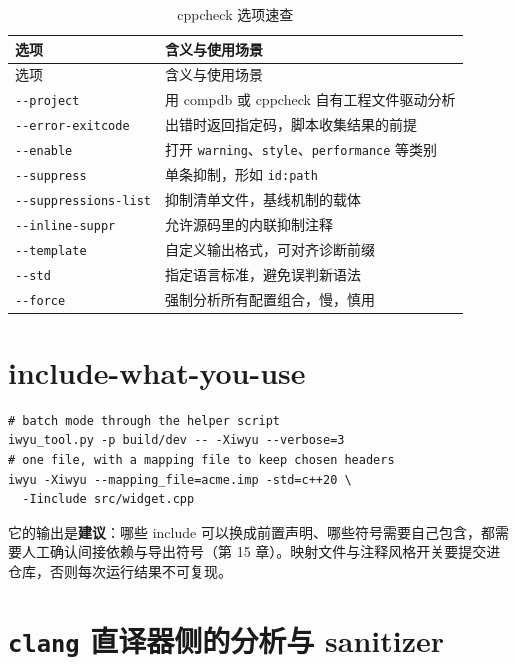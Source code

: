 \documentclass[12pt,a4paper,fontset=fandol]{ctexbook}
\newcommand{\Opt}[1]{\texttt{-\/-#1}}
\begin{document}
{\footnotesize
\begin{longtable}{@{}>{\raggedright\arraybackslash}p{}
                  >{\raggedright\arraybackslash}p{}@{}}
\caption{cppcheck 选项速查}\label{tab:appB-cppcheck}\\
\toprule
选项 & 含义与使用场景 \\
\midrule
\endfirsthead
\toprule
选项 & 含义与使用场景 \\
\midrule
\endhead
\bottomrule
\endlastfoot
\Opt{project} & 用 compdb 或 cppcheck 自有工程文件驱动分析 \\
\Opt{error-exitcode} & 出错时返回指定码，脚本收集结果的前提 \\
\Opt{enable} & 打开 \texttt{warning}、\texttt{style}、\texttt{performance} 等类别 \\
\Opt{suppress} & 单条抑制，形如 \texttt{id:path} \\
\Opt{suppressions-list} & 抑制清单文件，基线机制的载体 \\
\Opt{inline-suppr} & 允许源码里的内联抑制注释 \\
\Opt{template} & 自定义输出格式，可对齐诊断前缀 \\
\Opt{std} & 指定语言标准，避免误判新语法 \\
\Opt{force} & 强制分析所有配置组合，慢，慎用 \\
\end{longtable}
}

\section{include-what-you-use}\label{sec:appB-s6}

\begin{lstlisting}[style=shellstyle,caption={iwyu 的批量与单文件用法}]
# batch mode through the helper script
iwyu_tool.py -p build/dev -- -Xiwyu --verbose=3
# one file, with a mapping file to keep chosen headers
iwyu -Xiwyu --mapping_file=acme.imp -std=c++20 \
  -Iinclude src/widget.cpp
\end{lstlisting}

它的输出是\textbf{建议}：哪些 include 可以换成前置声明、哪些符号需要自己包含，都需要人工确认间接依赖与导出符号（第 15 章）。映射文件与注释风格开关要提交进仓库，否则每次运行结果不可复现。

\section{\texttt{clang} 直译器侧的分析与 sanitizer}\label{sec:appB-s7}
\end{document}
